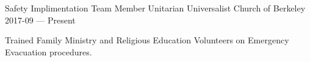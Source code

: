 


\begin{cventries}

  \cventry
    {Safety Implimentation Team Member} %
    {Unitarian Universalist Church of Berkeley} %
    {} %
    {2017-09 — Present} %
    {
      \begin{cvitems} %
        \item {Trained Family Ministry and Religious Education Volunteers on Emergency Evacuation procedures.}
      \end{cvitems}
    }


\end{cventries}

